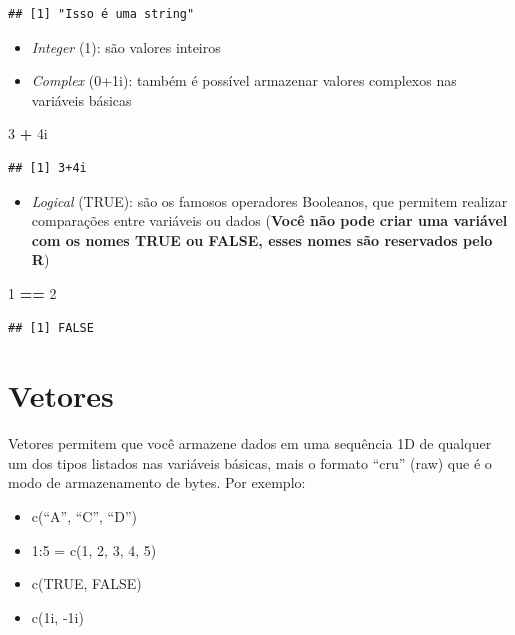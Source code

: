 \documentclass[]{book}
\newenvironment{Shaded}{\begin{snugshade}}{\end{snugshade}}
\newcommand{\DecValTok}[1]{\textcolor[rgb]{0.00,0.00,0.81}{#1}}
\newcommand{\StringTok}[1]{\textcolor[rgb]{0.31,0.60,0.02}{#1}}
\newcommand{\OperatorTok}[1]{\textcolor[rgb]{0.81,0.36,0.00}{\textbf{#1}}}
\newcommand{\NormalTok}[1]{#1}
\providecommand{\tightlist}{%
  \setlength{\itemsep}{0pt}\setlength{\parskip}{0pt}}
\theoremstyle{definition}
\theoremstyle{definition}
\theoremstyle{definition}
\theoremstyle{remark}
\begin{document}
\begin{verbatim}
## [1] "Isso é uma string"
\end{verbatim}

\begin{itemize}
\item
  \emph{Integer} (1): são valores inteiros
\item
  \emph{Complex} (0+1i): também é possível armazenar valores complexos
  nas variáveis básicas
\end{itemize}

\begin{Shaded}
\begin{Highlighting}[]
\DecValTok{3} \OperatorTok{+}\StringTok{ }\NormalTok{4i}
\end{Highlighting}
\end{Shaded}

\begin{verbatim}
## [1] 3+4i
\end{verbatim}

\begin{itemize}
\tightlist
\item
  \emph{Logical} (TRUE): são os famosos operadores Booleanos, que
  permitem realizar comparações entre variáveis ou dados (\textbf{Você
  não pode criar uma variável com os nomes TRUE ou FALSE, esses nomes
  são reservados pelo R})
\end{itemize}

\begin{Shaded}
\begin{Highlighting}[]
\DecValTok{1} \OperatorTok{==}\StringTok{ }\DecValTok{2}
\end{Highlighting}
\end{Shaded}

\begin{verbatim}
## [1] FALSE
\end{verbatim}

\section{Vetores}\label{vetores}

Vetores permitem que você armazene dados em uma sequência 1D de qualquer
um dos tipos listados nas variáveis básicas, mais o formato ``cru''
(raw) que é o modo de armazenamento de bytes. Por exemplo:

\begin{itemize}
\tightlist
\item
  c(``A'', ``C'', ``D'')
\item
  1:5 = c(1, 2, 3, 4, 5)
\item
  c(TRUE, FALSE)
\item
  c(1i, -1i)
\end{itemize}
\end{document}
